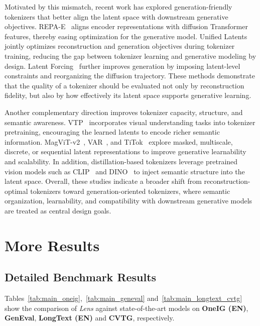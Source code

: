 \documentclass{llmxive}
\begin{document}
Motivated by this mismatch, recent work has explored generation-friendly tokenizers that better align the latent space with downstream generative objectives. REPA-E~\citep{leng2025repae} aligns encoder representations with diffusion Transformer features, thereby easing optimization for the generative model. Unified Latents~\citep{hu2024unifiedlatents} jointly optimizes reconstruction and generation objectives during tokenizer training, reducing the gap between tokenizer learning and generative modeling by design. Latent Forcing~\citep{tu2024latentforcing} further improves generation by imposing latent-level constraints and reorganizing the diffusion trajectory. These methods demonstrate that the quality of a tokenizer should be evaluated not only by reconstruction fidelity, but also by how effectively its latent space supports generative learning.

Another complementary direction improves tokenizer capacity, structure, and semantic awareness. VTP~\citep{vtp} incorporates visual understanding tasks into tokenizer pretraining, encouraging the learned latents to encode richer semantic information. MagViT-v2~\citep{yu2023magvitv2}, VAR~\citep{tian2024visual}, and TiTok~\citep{yu2024titok} explore masked, multiscale, discrete, or sequential latent representations to improve generative learnability and scalability. In addition, distillation-based tokenizers leverage pretrained vision models such as CLIP~\citep{radford2021clip} and DINO~\citep{cijosevic2021dino} to inject semantic structure into the latent space. Overall, these studies indicate a broader shift from reconstruction-optimal tokenizers toward generation-oriented tokenizers, where semantic organization, learnability, and compatibility with downstream generative models are treated as central design goals.

\section{More Results}
\label{sec:detailed-results}





\subsection{Detailed Benchmark Results}
\label{sec:benchmark-details}


Tables~\ref{tab:main_oneig},~\ref{tab:main_geneval} and~\ref{tab:main_longtext_cvtg} show the comparison of \textit{Lens} against state-of-the-art models on \textbf{OneIG (EN)}, \textbf{GenEval}, \textbf{LongText (EN)} and \textbf{CVTG}, respectively.
\end{document}
